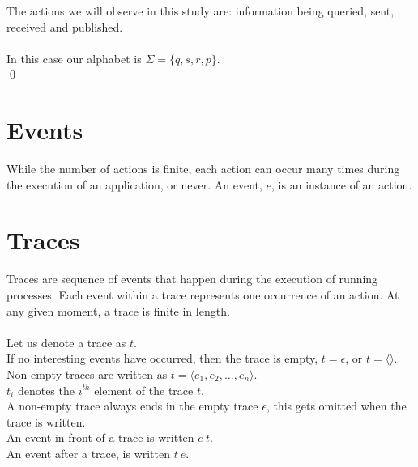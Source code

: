 \begin{myEx}
The actions we will observe in this study are: information being queried, sent, received and published.\\
\\
In this case our alphabet is $ \Sigma = \{ q, s, r, p \} $.\\
\qed
\end{myEx}

\section{Events}
\label{sec: LTL Events}

While the number of actions is finite, each action can occur many times during the execution of an application, or never.  An event, $e$, is an instance of an action.

\section{Traces}
\label{sec:Traces}

Traces are sequence of events that happen during the execution of running processes.  Each event within a trace represents one occurrence of an action.  At any given moment, a trace is finite in length.\\
\\ \noindent
Let us denote a trace as $t$.\\
If no interesting events have occurred, then the trace is empty, $t = \epsilon$, or $t = \langle \rangle$.\\
Non-empty traces are written as $t = \langle e_1,e_2,...,e_n \rangle$.\\
$t_i$ denotes the $i^{th}$ element of the trace $t$.\\
A non-empty trace always ends in the empty trace $\epsilon$, this gets omitted when the trace is written.\\
An event in front of a trace is written $e\ t$.\\
An event after a trace, is written $t\ e$.

